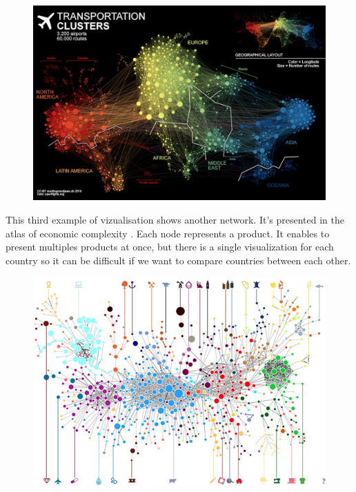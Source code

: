 \documentclass{vgtc}
\begin{document}
\begin{figure}[H]
\center
\includegraphics[scale=0.15]{airports-network-small.jpg}
\end{figure}

This third example of vizualisation shows another network. It’s presented in the atlas of economic complexity \cite{atlas}. Each node represents a product. It enables to present multiples products at once, but there is a single visualization for each country so it can be difficult if we want to compare countries between each other.

\begin{figure}[H]
\center
\includegraphics[scale=0.4]{economic_growth_atlas2.jpg}
\end{figure}
\end{document}
